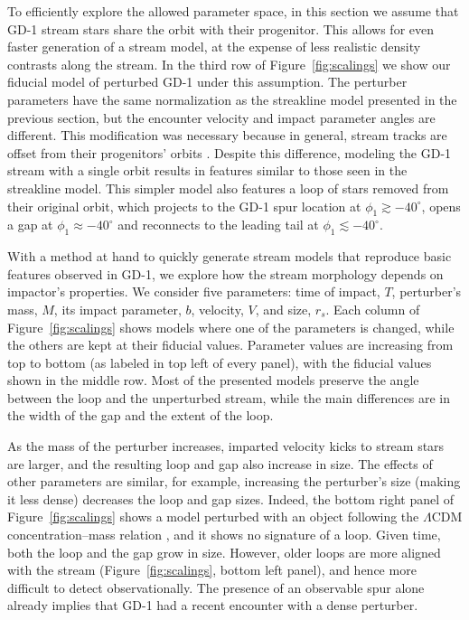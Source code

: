 \documentclass[twocolumn]{aastex62}
\begin{document}
To efficiently explore the allowed parameter space, in this section we assume that GD-1 stream stars share the orbit with their progenitor.
This allows for even faster generation of a stream model, at the expense of less realistic density contrasts along the stream.
In the third row of Figure~\ref{fig:scalings} we show our fiducial model of perturbed GD-1 under this assumption.
The perturber parameters have the same normalization as the streakline model presented in the previous section, but the encounter velocity and impact parameter angles are different.
This modification was necessary because in general, stream tracks are offset from their progenitors' orbits \citep{sb2013}. 
Despite this difference, modeling the GD-1 stream with a single orbit results in features similar to those seen in the streakline model.
This simpler model also features a loop of stars removed from their original orbit, which projects to the GD-1 spur location at $\phi_1\gtrsim-40^\circ$, opens a gap at $\phi_1\approx-40^\circ$ and reconnects to the leading tail at $\phi_1\lesssim-40^\circ$.

With a method at hand to quickly generate stream models that reproduce basic features observed in GD-1, we explore how the stream morphology depends on impactor's properties.
We consider five parameters: time of impact, $T$, perturber's mass, $M$, its impact parameter, $b$, velocity, $V$, and size, $r_s$.
Each column of Figure~\ref{fig:scalings} shows models where one of the parameters is changed, while the others are kept at their fiducial values.
Parameter values are increasing from top to bottom (as labeled in top left of every panel), with the fiducial values shown in the middle row.
Most of the presented models preserve the angle between the loop and the unperturbed stream, while the main differences are in the width of the gap and the extent of the loop.

As the mass of the perturber increases, imparted velocity kicks to stream stars are larger, and the resulting loop and gap also increase in size.
The effects of other parameters are similar, for example, increasing the perturber's size (making it less dense) decreases the loop and gap sizes.
Indeed, the bottom right panel of Figure~\ref{fig:scalings} shows a model perturbed with an object following the $\Lambda$CDM concentration--mass relation \citep{diemer2018}, and it shows no signature of a loop.
Given time, both the loop and the gap grow in size.
However, older loops are more aligned with the stream (Figure~\ref{fig:scalings}, bottom left panel), and hence more difficult to detect observationally.
The presence of an observable spur alone already implies that GD-1 had a recent encounter with a dense perturber.
\end{document}
